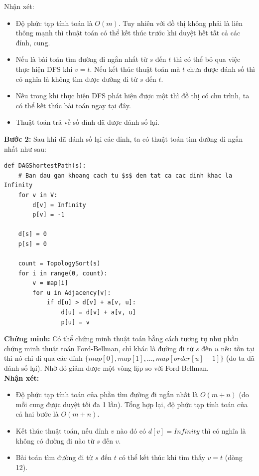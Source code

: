 \documentclass[a4paper,12pt]{report}
\begin{document}
        Nhận xét:
        \begin{itemize}
            \item Độ phức tạp tính toán là $O(m)$. Tuy nhiên với đồ thị không
                phải là liên thông mạnh thì thuật toán có thể kết thúc trước
                khi duyệt hết tất cả các đỉnh, cung.
            \item Nếu là bài toán tìm đường đi ngắn nhất từ $s$ đến $t$ thì có
                thể bỏ qua việc thực hiện DFS khi $v = t$. Nếu kết thúc thuật
                toán mà $t$ chưa được đánh số thì có nghĩa là không tìm được
                đường đi từ $s$ đến $t$.
            \item Nếu trong khi thực hiện DFS phát hiện được một  thì đồ thị có chu trình, ta có thể kết
                thúc bài toán ngay tại đây.
            \item Thuật toán trả về số đỉnh đã được đánh số lại.
        \end{itemize}

        \textbf{Bước 2:} Sau khi đã đánh số lại các đỉnh, ta có thuật toán tìm
        đường đi ngắn nhất như sau:\\
        \begin{verbatim}
def DAGShortestPath(s):
    # Ban dau gan khoang cach tu $s$ den tat ca cac dinh khac la Infinity
    for v in V:
        d[v] = Infinity
        p[v] = -1
    
    d[s] = 0
    p[s] = 0

    count = TopologySort(s)
    for i in range(0, count):
        v = map[i]
        for u in Adjacency[v]:
            if d[u] > d[v] + a[v, u]:
                d[u] = d[v] + a[v, u]
                p[u] = v
        \end{verbatim}
        
        \textbf{Chứng minh:} Có thể chứng minh thuật toán bằng cách tương tự
        như phần chứng minh thuật toán Ford-Bellman, chỉ khác là đường đi từ
        $s$ đến $u$ nếu tồn tại thì nó chỉ đi qua các đỉnh $\{map[0], map[1],
        ..., map[order[u]-1]\}$ (do ta đã đánh số lại). Nhờ đó giảm được một
        vòng lặp so với Ford-Bellman.\\

        \textbf{Nhận xét:}
        \begin{itemize}
            \item Độ phức tạp tính toán của phần tìm đường đi ngắn nhất là
                $O(m+n)$ (do mỗi cung được duyệt tối đa 1 lần). Tổng hợp lại, 
                độ phức tạp tính toán của cả hai bước là $O(m+n)$.
            \item Kết thúc thuật toán, nếu đỉnh $v$ nào đó có $d[v] = Infinity$
                thì có nghĩa là không có đường đi nào từ $s$ đến $v$.
            \item Bài toán tìm đường đi từ $s$ đến $t$ có thể kết thúc khi tìm
                thấy $v = t$ (dòng 12).
        \end{itemize}
\end{document}

